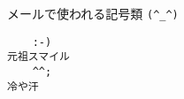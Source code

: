 \documentclass{jlreq}
\begin{document}
メールで使われる記号類 \verb|(^_^)|
\begin{verbatim}
    :-)                                                                元祖スマイル
    ^^;                                                                冷や汗
\end{verbatim}
\end{document}
